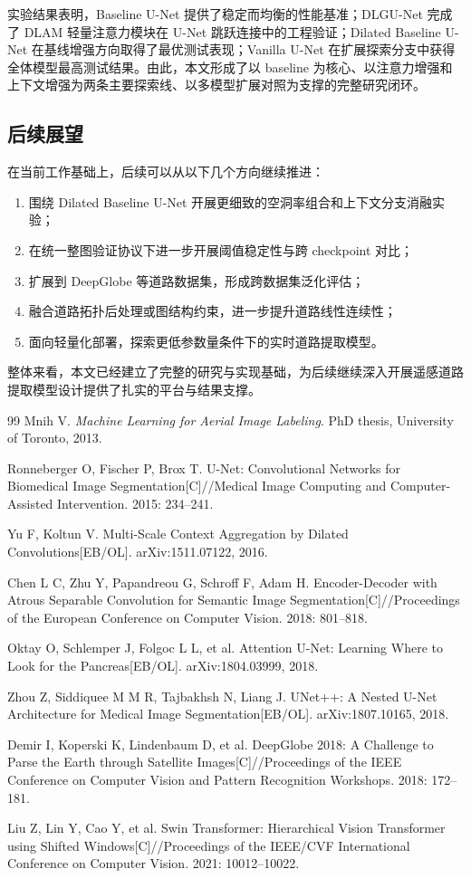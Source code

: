 \documentclass[12pt,a4paper]{ctexart}
\begin{document}
实验结果表明，Baseline U-Net 提供了稳定而均衡的性能基准；DLGU-Net 完成了 DLAM 轻量注意力模块在 U-Net 跳跃连接中的工程验证；Dilated Baseline U-Net 在基线增强方向取得了最优测试表现；Vanilla U-Net 在扩展探索分支中获得全体模型最高测试结果。由此，本文形成了以 baseline 为核心、以注意力增强和上下文增强为两条主要探索线、以多模型扩展对照为支撑的完整研究闭环。

\subsection{后续展望}
在当前工作基础上，后续可以从以下几个方向继续推进：
\begin{enumerate}[label=\arabic*)]
    \item 围绕 Dilated Baseline U-Net 开展更细致的空洞率组合和上下文分支消融实验；
    \item 在统一整图验证协议下进一步开展阈值稳定性与跨 checkpoint 对比；
    \item 扩展到 DeepGlobe 等道路数据集，形成跨数据集泛化评估；
    \item 融合道路拓扑后处理或图结构约束，进一步提升道路线性连续性；
    \item 面向轻量化部署，探索更低参数量条件下的实时道路提取模型。
\end{enumerate}

整体来看，本文已经建立了完整的研究与实现基础，为后续继续深入开展遥感道路提取模型设计提供了扎实的平台与结果支撑。

\begin{thebibliography}{99}
Mnih V. \textit{Machine Learning for Aerial Image Labeling}. PhD thesis, University of Toronto, 2013.

Ronneberger O, Fischer P, Brox T. U-Net: Convolutional Networks for Biomedical Image Segmentation[C]//Medical Image Computing and Computer-Assisted Intervention. 2015: 234--241.

Yu F, Koltun V. Multi-Scale Context Aggregation by Dilated Convolutions[EB/OL]. arXiv:1511.07122, 2016.

Chen L C, Zhu Y, Papandreou G, Schroff F, Adam H. Encoder-Decoder with Atrous Separable Convolution for Semantic Image Segmentation[C]//Proceedings of the European Conference on Computer Vision. 2018: 801--818.

Oktay O, Schlemper J, Folgoc L L, et al. Attention U-Net: Learning Where to Look for the Pancreas[EB/OL]. arXiv:1804.03999, 2018.

Zhou Z, Siddiquee M M R, Tajbakhsh N, Liang J. UNet++: A Nested U-Net Architecture for Medical Image Segmentation[EB/OL]. arXiv:1807.10165, 2018.

Demir I, Koperski K, Lindenbaum D, et al. DeepGlobe 2018: A Challenge to Parse the Earth through Satellite Images[C]//Proceedings of the IEEE Conference on Computer Vision and Pattern Recognition Workshops. 2018: 172--181.

Liu Z, Lin Y, Cao Y, et al. Swin Transformer: Hierarchical Vision Transformer using Shifted Windows[C]//Proceedings of the IEEE/CVF International Conference on Computer Vision. 2021: 10012--10022.
\end{thebibliography}
\end{document}
